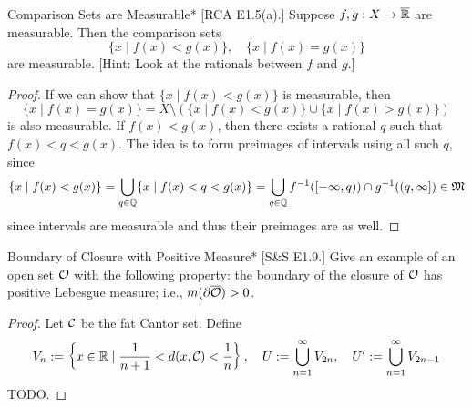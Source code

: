 \begin{problem}{Comparison Sets are Measurable}*
    [RCA E1.5(a).] Suppose \(f,g : X \to \overline{\mathbb{R}}\) are measurable. Then the comparison sets 
    \[
        \{x \mid f(x) < g(x)\}, \quad \{x \mid f(x) = g(x)\}
    \]
    are measurable. [Hint: Look at the rationals between \(f\) and \(g\).]
\end{problem}

\begin{proof}
    If we can show that \(\{x \mid f(x) < g(x)\}\) is measurable, then 
    \[
        \{x \mid f(x) = g(x)\} = X \setminus (\{x \mid f(x) < g(x)\} \cup \{x \mid f(x) > g(x)\})
    \] 
    is also measurable. If \(f(x) < g(x)\), then there exists a rational \(q\) such that \(f(x) < q < g(x)\). The idea is to form preimages of intervals using all such \(q\), since 
    \[
    \{x \mid f(x) < g(x) \}
    = \bigcup_{q \in \mathbb{Q}} \{x \mid f(x) < q < g(x)\}
    = \bigcup_{q \in \mathbb{Q}} f^{-1}([-\infty, q)) \cap g^{-1}((q, \infty])
    \in \mathfrak{M}
    \]
    since intervals are measurable and thus their preimages are as well. 
\end{proof}

\begin{problem}{Boundary of Closure with Positive Measure}*
    [S\&S E1.9.] Give an example of an open set \(\mathcal{O}\) with the following property: the boundary of the closure of \(\mathcal{O}\) has positive Lebesgue measure; i.e., \(m(\partial \overline{\mathcal{O}}) > 0\). 
\end{problem}

\begin{proof}
    Let \(\mathcal{C}\) be the fat Cantor set. Define 
    \[
        V_n := \left\{ x \in \mathbb{R} \mid \frac{1}{n+1} < d(x, \mathcal{C}) < \frac{1}{n} \right\},
        \quad
        U := \bigcup_{n=1}^\infty V_{2n}, 
        \quad
        U' := \bigcup_{n=1}^\infty V_{2n-1}
    \]
    TODO. 
\end{proof}


